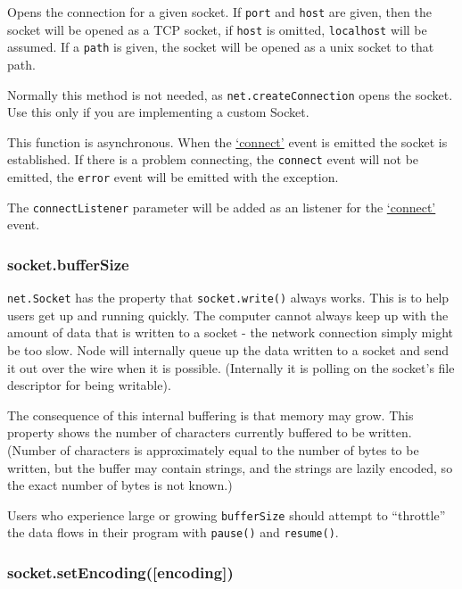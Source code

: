 Opens the connection for a given socket. If \texttt{port} and
\texttt{host} are given, then the socket will be opened as a TCP socket,
if \texttt{host} is omitted, \texttt{localhost} will be assumed. If a
\texttt{path} is given, the socket will be opened as a unix socket to
that path.

Normally this method is not needed, as \texttt{net.createConnection}
opens the socket. Use this only if you are implementing a custom Socket.

This function is asynchronous. When the
\hyperref[netux5feventux5fconnect]{`connect'} event is emitted the
socket is established. If there is a problem connecting, the
\texttt{\textquotesingle{}connect\textquotesingle{}} event will not be
emitted, the \texttt{\textquotesingle{}error\textquotesingle{}} event
will be emitted with the exception.

The \texttt{connectListener} parameter will be added as an listener for
the \hyperref[netux5feventux5fconnect]{`connect'} event.

\subsubsection{socket.bufferSize}\label{socket.buffersize}

\texttt{net.Socket} has the property that \texttt{socket.write()} always
works. This is to help users get up and running quickly. The computer
cannot always keep up with the amount of data that is written to a
socket - the network connection simply might be too slow. Node will
internally queue up the data written to a socket and send it out over
the wire when it is possible. (Internally it is polling on the socket's
file descriptor for being writable).

The consequence of this internal buffering is that memory may grow. This
property shows the number of characters currently buffered to be
written. (Number of characters is approximately equal to the number of
bytes to be written, but the buffer may contain strings, and the strings
are lazily encoded, so the exact number of bytes is not known.)

Users who experience large or growing \texttt{bufferSize} should attempt
to ``throttle'' the data flows in their program with \texttt{pause()}
and \texttt{resume()}.

\subsubsection{socket.setEncoding({[}encoding{]})}\label{socket.setencodingencoding}

